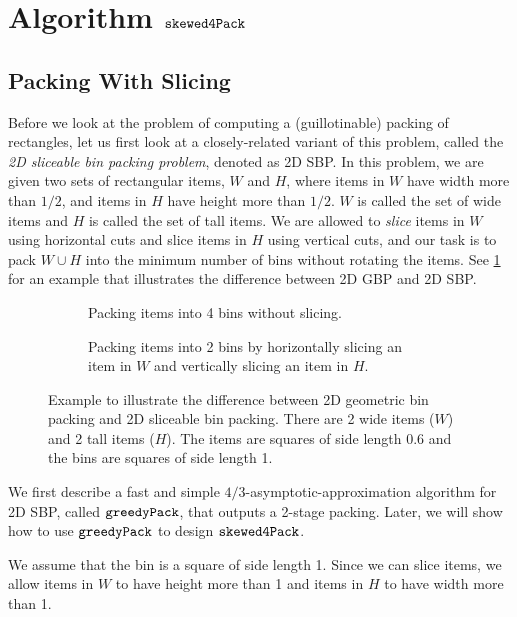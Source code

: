 \section{Algorithm \texorpdfstring{$\operatorname{\mathtt{skewed4Pack}}$}{thin4Pack}}
\label{sec:thin-gpack}

\subsection{Packing With Slicing}

Before we look at the problem of computing a (guillotinable) packing of \thin{} rectangles,
let us first look at a closely-related variant of this problem,
called the \emph{2D sliceable bin packing problem}, denoted as 2D SBP.
In this problem, we are given two sets of rectangular items, $W$ and $H$, where
items in $W$ have width more than $1/2$, and items in $H$ have height more than $1/2$.
$W$ is called the set of wide items and $H$ is called the set of tall items.
We are allowed to \emph{slice} items in $W$ using horizontal cuts
and slice items in $H$ using vertical cuts, and our task is to pack
$W \cup H$ into the minimum number of bins without rotating the items.
See \cref{fig:bp-vs-sbp} for an example that illustrates the difference
between 2D GBP and 2D SBP.

\begin{figure}[htb]
\begin{subfigure}{0.45\textwidth}
\centering

\caption{Packing items into 4 bins without slicing.}
\end{subfigure}
\hfil
\begin{subfigure}{0.45\textwidth}
\centering

\caption{Packing items into 2 bins by horizontally slicing an item in $W$
and vertically slicing an item in $H$.}
\end{subfigure}
\caption[2D GBP vs.~2D SBP]%
{Example to illustrate the difference between 2D geometric bin packing
and 2D sliceable bin packing. There are 2 wide items ($W$) and 2 tall items ($H$).
The items are squares of side length 0.6 and the bins are squares of side length 1.}
\label{fig:bp-vs-sbp}
\end{figure}

We first describe a fast and simple $4/3$-asymptotic-approximation algorithm
for 2D SBP, called $\operatorname{\mathtt{greedyPack}}$, that outputs a 2-stage packing.
Later, we will show how to use $\operatorname{\mathtt{greedyPack}}$ to design $\operatorname{\mathtt{skewed4Pack}}$.

We assume that the bin is a square of side length 1. Since we can slice items,
we allow items in $W$ to have height more than 1
and items in $H$ to have width more than 1.

